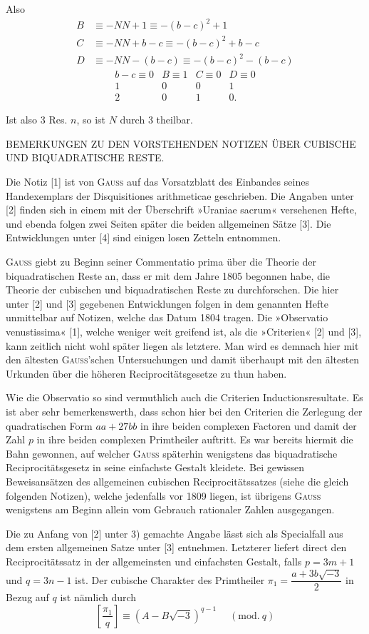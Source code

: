 \noindent\unskip{}Also
\[\begin{aligned}B&\equiv-NN+1\equiv-(b-c)^2+1\\C&\equiv-NN+b-c\equiv-(b-c)^2+b-c\\D&\equiv-NN-(b-c)\equiv-(b-c)^2-(b-c)\end{aligned}\]
\[\begin{array}{rrrr}
b-c\equiv0&B\equiv1&C\equiv0&D\equiv0\\1&0&0&1\\2&0&1&0.
\end{array}\]
\par\noindent\hspace*{\parindent}Ist also 3 Res. $n$, so ist $N$ durch 3 theilbar.
\begingroup\small
\begin{center}BEMERKUNGEN ZU DEN VORSTEHENDEN NOTIZEN ÜBER CUBISCHE UND BIQUADRATISCHE RESTE.\end{center}
\noindent\hspace*{\parindent}Die Notiz [1] ist von \textsc{Gauss} auf das Vorsatzblatt des Einbandes seines Handexemplars der Disquisitiones arithmeticae geschrieben. Die Angaben unter [2] finden sich in einem mit der Überschrift »Uraniae sacrum« versehenen Hefte, und ebenda folgen zwei Seiten später die beiden allgemeinen Sätze [3]. Die Entwicklungen unter [4] sind einigen losen Zetteln entnommen.

\textsc{Gauss} giebt zu Beginn seiner Commentatio prima über die Theorie der biquadratischen Reste an, dass er mit dem Jahre 1805 begonnen habe, die Theorie der cubischen und biquadratischen Reste zu durchforschen. Die hier unter [2] und [3] gegebenen Entwicklungen folgen in dem genannten Hefte unmittelbar auf Notizen, welche das Datum 1804 tragen. Die »Observatio venustissima« [1], welche weniger weit greifend ist, als die »Criterien« [2] und [3], kann zeitlich nicht wohl später liegen als letztere. Man wird es demnach hier mit den ältesten \textsc{Gauss}'schen Untersuchungen und damit überhaupt mit den ältesten Urkunden über die höheren Reciprocitätsgesetze zu thun haben.

Wie die Observatio so sind vermuthlich auch die Criterien Inductionsresultate. Es ist aber sehr bemerkenswerth, dass schon hier bei den Criterien die Zerlegung der quadratischen Form $aa+27bb$ in ihre beiden complexen Factoren und damit der Zahl $p$ in ihre beiden complexen Primtheiler auftritt. Es war bereits hiermit die Bahn gewonnen, auf welcher \textsc{Gauss} späterhin wenigstens das biquadratische Reciprocitätsgesetz in seine einfachste Gestalt kleidete. Bei gewissen Beweisansätzen des allgemeinen cubischen Reciprocitätssatzes (siehe die gleich folgenden Notizen), welche jedenfalls vor 1809 liegen, ist übrigens \textsc{Gauss} wenigstens am Beginn allein vom Gebrauch rationaler Zahlen ausgegangen.

Die zu Anfang von [2] unter 3) gemachte Angabe lässt sich als Specialfall aus dem ersten allgemeinen Satze unter [3] entnehmen. Letzterer liefert direct den Reciprocitätssatz in der allgemeinsten und einfachsten Gestalt, falls $p=3m+1$ und $q=3n-1$ ist. Der cubische Charakter des Primtheiler $\pi_1=\dfrac{a+3b\sqrt{-3}}{2}$ in Bezug auf $q$ ist nämlich durch
\[\left[\frac{\pi_1}{q}\right]\equiv(A-B\sqrt{-3})^{q-1}\quad\;(\mathrm{mod.}\ q)\]
